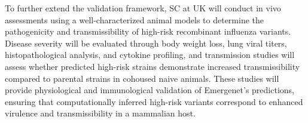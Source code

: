 \documentclass[onecolumn, compsoc,11pt]{IEEEtran}
\begin{document}
To further extend the validation framework, SC at UK will conduct in vivo assessments using a well-characterized animal models to determine the pathogenicity and transmissibility of high-risk recombinant influenza variants. Disease severity will be evaluated through body weight loss, lung viral titers, histopathological analysis, and cytokine profiling, and transmission studies will assess whether predicted high-risk strains demonstrate increased transmissibility compared to parental strains in cohoused naive animals. These studies will provide physiological and immunological validation of Emergenet’s predictions, ensuring that computationally inferred high-risk variants correspond to enhanced virulence and transmissibility in a mammalian host.



 \clearpage

%
%


\end{document}
